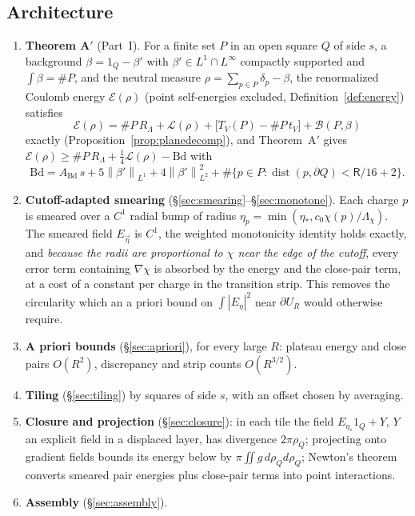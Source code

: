 \documentclass[11pt,reqno]{amsart}
\numberwithin{equation}{section}
\theoremstyle{plain}
\theoremstyle{definition}
\newcommand{\Lam}{\Lambda}
\newcommand{\dist}{\operatorname{dist}}
\newcommand{\norm}[1]{\left\|#1\right\|}
\newcommand{\cL}{\mathcal{L}}
\newcommand{\cE}{\mathcal{E}}
\newcommand{\cB}{\mathcal{B}}
\newcommand{\fR}{\mathsf{R}}
\newcommand{\Bd}{\mathrm{Bd}}
\begin{document}
\subsection{Architecture}
\begin{enumerate}[label=\textbf{Step~\arabic*.},leftmargin=*]
\item \textbf{Theorem A$'$} (Part~I).  For a finite set $P$ in an open square $Q$ of side $s$, a background $\beta=1_Q-\beta'$ with $\beta'\in L^1\cap L^\infty$ compactly supported and $\int\beta=\#P$, and the neutral measure $\rho=\sum_{p\in P}\delta_p-\beta$, the renormalized Coulomb energy $\cE(\rho)$ (point self-energies excluded, Definition~\ref{def:energy}) satisfies
\[
\cE(\rho)=\#P\,R_\Lam+\cL(\rho)+\big[T_V(P)-\#P\,t_V\big]+\cB(P,\beta)
\]
exactly (Proposition~\ref{prop:planedecomp}), and Theorem~A$'$ gives $\cE(\rho)\ge\#P\,R_\Lam+\frac14\cL(\rho)-\Bd$ with
\[
\Bd=A_\Bd\,s+5\norm{\beta'}_{L^1}+4\norm{\beta'}_{L^2}^2+\#\{p\in P:\dist(p,\partial Q)<\fR/16+2\}.
\]
\item \textbf{Cutoff-adapted smearing} (\S\ref{sec:smearing}--\S\ref{sec:monotone}).  Each charge $p$ is smeared over a $C^1$ radial bump of radius $\eta_p=\min(\eta_*,c_0\chi(p)/\Lambda_\chi)$.  The smeared field $E_{\vec\eta}$ is $C^1$, the weighted monotonicity identity holds exactly, and \emph{because the radii are proportional to $\chi$ near the edge of the cutoff}, every error term containing $\nabla\chi$ is absorbed by the energy and the close-pair term, at a cost of a constant per charge in the transition strip.  This removes the circularity which an a priori bound on $\int|E_\eta|^2$ near $\partial U_R$ would otherwise require.
\item \textbf{A priori bounds} (\S\ref{sec:apriori}), for every large $R$: plateau energy and close pairs $O(R^2)$, discrepancy and strip counts $O(R^{3/2})$.
\item \textbf{Tiling} (\S\ref{sec:tiling}) by squares of side $s$, with an offset chosen by averaging.
\item \textbf{Closure and projection} (\S\ref{sec:closure}): in each tile the field $E_{\eta_*}1_Q+Y$, $Y$ an explicit field in a displaced layer, has divergence $2\pi\rho_Q$; projecting onto gradient fields bounds its energy below by $\pi\iint g\,d\rho_Qd\rho_Q$; Newton's theorem converts smeared pair energies plus close-pair terms into point interactions.
\item \textbf{Assembly} (\S\ref{sec:assembly}).
\end{enumerate}
\end{document}
